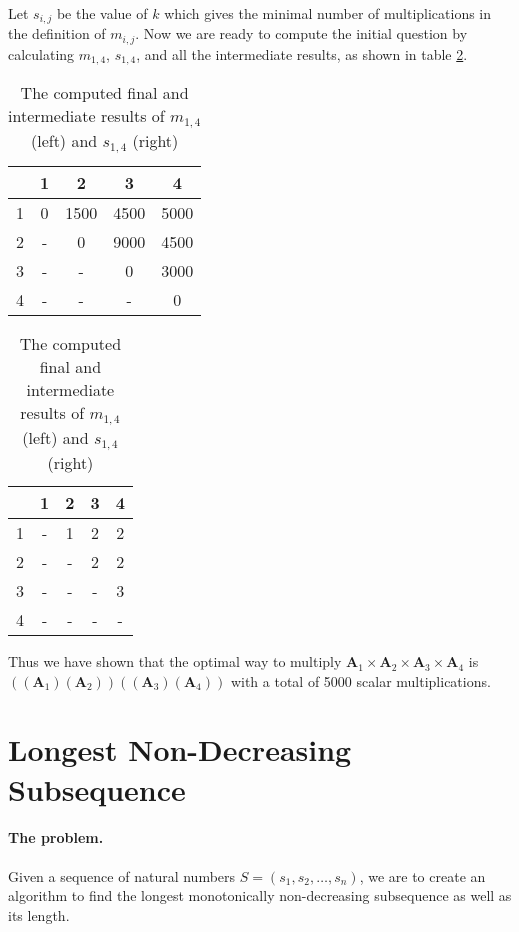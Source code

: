 \documentclass{article}
\begin{document}
Let \(s_{i,j}\) be the value of \(k\) which gives the minimal number of multiplications in the definition of \(m_{i,j}\). Now we are ready to compute the initial question by calculating \(m_{1,4}\), \(s_{1,4}\), and all the intermediate results, as shown in table \ref{q1}.

\begin{table}[h]
	\centering
	\begin{tabular}{|c|cccc|}
		\hline
		\backslashbox{\(i\)}{\(j\)} & 1 & 2    & 3    & 4 \\
		\hline
		1                           & 0 & 1500 & 4500 & 5000 \\
		2                           & - & 0    & 9000 & 4500 \\
		3                           & - & -    & 0    & 3000 \\
		4                           & - & -    & -    & 0 \\
		\hline
	\end{tabular}
	\begin{tabular}{|c|cccc|}
		\hline
		\backslashbox{\(i\)}{\(j\)} & 1 & 2 & 3 & 4 \\
		\hline
		1                           & - & 1 & 2 & 2 \\
		2                           & - & - & 2 & 2 \\
		3                           & - & - & - & 3 \\
		4                           & - & - & - & - \\
		\hline
	\end{tabular}
	\caption{The computed final and intermediate results of \(m_{1,4}\) (left) and \(s_{1,4}\) (right)}
	\label{q1}
\end{table}

Thus we have shown that the optimal way to multiply \(\mathbf{A}_1 \times \mathbf{A}_2 \times \mathbf{A}_3 \times \mathbf{A}_4\) is \(((\mathbf{A}_1)(\mathbf{A}_2))((\mathbf{A}_3)(\mathbf{A}_4))\) with a total of 5000 scalar multiplications.

\section{Longest Non-Decreasing Subsequence}

\paragraph{The problem.} Given a sequence of natural numbers \(S = (s_1, s_2, \dots, s_n)\), we are to create an algorithm to find the longest monotonically non-decreasing subsequence as well as its length.
\end{document}
